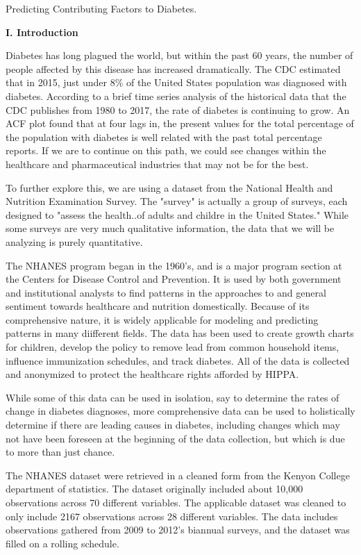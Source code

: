 \documentclass[letter,12pt]{article}
\begin{document}
	\begin{center}
		Predicting Contributing Factors to Diabetes.
	\end{center}
	\begin{center}
		\textbf{I. Introduction}
	\end{center}
	\justify
	\indent Diabetes has long plagued the world, but within the past 60 years, the number of people affected by this disease has increased dramatically. The CDC estimated that in 2015, just under 8\% of the United States population was diagnosed with diabetes. According to a brief time series analysis of the historical data that the CDC publishes from 1980 to 2017, the rate of diabetes is continuing to grow. An ACF plot found that at four lags in, the present values for the total percentage of the population with diabetes is well related with the past total percentage reports. If we are to continue on this path, we could see changes within the healthcare and pharmaceutical industries that may not be for the best.\par
	To further explore this, we are using a dataset from the National Health and Nutrition Examination Survey. The "survey" is actually a group of surveys, each designed to "assess the health..of adults and childre in the United States." While some surveys are very much qualitative information, the data that we will be analyzing is purely quantitative.\par
	The NHANES program began in the 1960's, and is a major program section at the Centers for Disease Control and Prevention. It is used by both government and institutional analysts to find patterns in the approaches to and general sentiment towards healthcare and nutrition domestically. Because of its comprehensive nature, it is widely applicable for modeling and predicting patterns in many diifferent fields. The data has been used to create growth charts for children, develop the policy to remove lead from common household items, influence immunization schedules, and track diabetes. All of the data is collected and anonymized to protect the healthcare rights afforded by HIPPA. \par
	While some of this data can be used in isolation, say to determine the rates of change in diabetes diagnoses, more comprehensive data can be used to holistically determine if there are leading causes in diabetes, including changes which may not have been foreseen at the beginning of the data collection, but which is due to more than just chance.\par
	The NHANES dataset were retrieved in a cleaned form from the Kenyon College department of statistics. The dataset originally included about 10,000 observations across 70 different variables. The applicable dataset was cleaned to only include 2167 observations across 28 different variables. The data includes observations gathered from 2009 to 2012's biannual surveys, and the dataset was filled on a rolling schedule.\par
	
\end{document}
